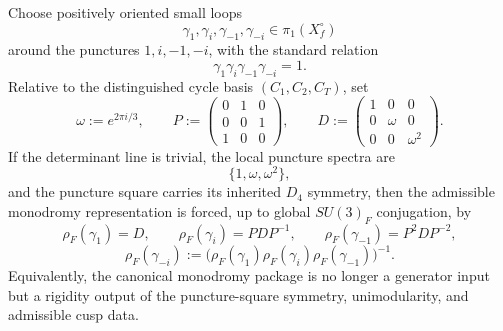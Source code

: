 
\begin{theorem}
\label{thm:d4-monodromy-rigidity}
\label{prop:generator-family-holonomy}
\label{thm:d4-riemann-hilbert-rigidity}
Choose positively oriented small loops
\[
\gamma_1,\gamma_i,\gamma_{-1},\gamma_{-i}\in\pi_1(X_f^\circ)
\]
around the punctures $1,i,-1,-i$, with the standard relation
\[
\gamma_1\gamma_i\gamma_{-1}\gamma_{-i}=1.
\]
Relative to the distinguished cycle basis $(C_1,C_2,C_T)$, set
\[
\omega:=e^{2\pi i/3},
\qquad
P:=
\begin{pmatrix}
0&1&0\\
0&0&1\\
1&0&0
\end{pmatrix},
\qquad
D:=
\begin{pmatrix}
1&0&0\\
0&\omega&0\\
0&0&\omega^2
\end{pmatrix}.
\]
If the determinant line is trivial, the local puncture spectra are
\[
\{1,\omega,\omega^2\},
\]
and the puncture square carries its inherited $D_4$ symmetry, then the admissible monodromy
representation is forced, up to global $SU(3)_F$ conjugation, by
\[
\rho_F(\gamma_1)=D,
\qquad
\rho_F(\gamma_i)=PDP^{-1},
\qquad
\rho_F(\gamma_{-1})=P^2DP^{-2},
\]
\[
\rho_F(\gamma_{-i})
:=
\bigl(\rho_F(\gamma_1)\rho_F(\gamma_i)\rho_F(\gamma_{-1})\bigr)^{-1}.
\]
Equivalently, the canonical monodromy package is no longer a generator input but a rigidity output
of the puncture-square symmetry, unimodularity, and admissible cusp data.
\end{theorem}

